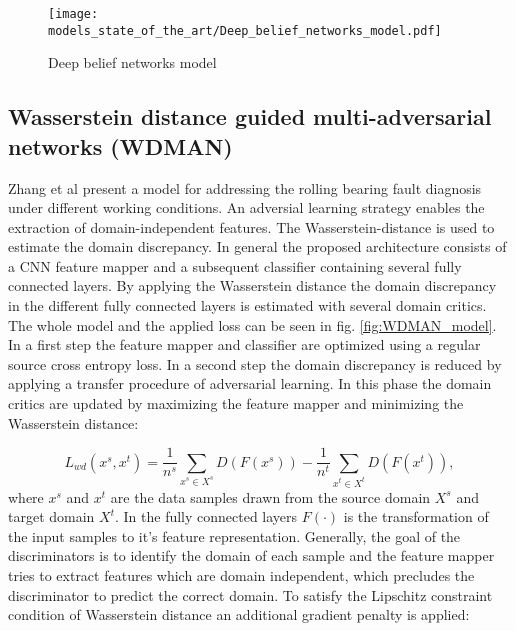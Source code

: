 {\begin{figure}[p]
  \centering
  \texttt{[image: models\_state\_of\_the\_art/Deep\_belief\_networks\_model.pdf]}
  \caption{Deep belief networks model \cite{Zhang2017}}
  \label{fig:Deep_belief_networks_model}
\end{figure}


\subsection{Wasserstein distance guided multi-adversarial networks (WDMAN)}
 Zhang et al \cite{Zhang2019} present a model for addressing the rolling bearing fault diagnosis under different working conditions. An adversial learning strategy enables the extraction of domain-independent features. The Wasserstein-distance is used to estimate the domain discrepancy. In general the proposed architecture consists of a CNN feature mapper and a subsequent classifier containing several fully connected layers. By applying the Wasserstein distance the domain discrepancy in the different fully connected layers is estimated with several domain critics. The whole model and the applied loss can be seen in fig. \ref{fig:WDMAN_model}. In a first step the feature mapper and classifier are optimized using a regular source cross entropy loss. In a second step the domain discrepancy is reduced by applying a transfer procedure of adversarial learning. In this phase the domain critics are updated by maximizing the feature mapper and minimizing the Wasserstein distance: 
 
 \begin{equation}
     L_{wd}(x^{s}, x^{t}) = \frac{1}{n^{s}} \sum_{x^{s} \in X^{s}} D(F(x^{s})) - \frac{1}{n^{t}} \sum_{x^{t} \in X^{t}} D(F(x^{t})),
 \end{equation}
 where $x^{s}$ and $x^{t}$ are the data samples drawn from the source domain $X^{s}$ and target domain $X^{t}$. In the fully connected layers $F(\cdot)$ is the transformation of the input samples to it's feature representation. Generally, the goal of the discriminators is to identify the domain of each sample and the feature mapper tries to extract features which are domain independent, which precludes the discriminator to predict the correct domain. To satisfy the Lipschitz constraint condition of Wasserstein distance an additional gradient penalty is applied: 

}
